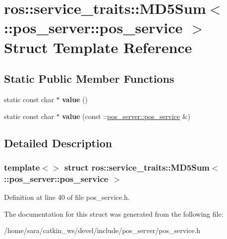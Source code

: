 \hypertarget{structros_1_1service__traits_1_1MD5Sum_3_01_1_1pos__server_1_1pos__service_01_4}{}\section{ros\+:\+:service\+\_\+traits\+:\+:M\+D5\+Sum$<$ \+:\+:pos\+\_\+server\+:\+:pos\+\_\+service $>$ Struct Template Reference}
\label{structros_1_1service__traits_1_1MD5Sum_3_01_1_1pos__server_1_1pos__service_01_4}
\subsection*{Static Public Member Functions}
\begin{DoxyCompactItemize}
\item 
\mbox{\label{structros_1_1service__traits_1_1MD5Sum_3_01_1_1pos__server_1_1pos__service_01_4_ab45735d9729ea45bd1fb07e1e0822a29}} 
static const char $\ast$ {\bfseries value} ()
\item 
\mbox{\label{structros_1_1service__traits_1_1MD5Sum_3_01_1_1pos__server_1_1pos__service_01_4_a321e272c5e52727cf869d2a4ccdd5f26}} 
static const char $\ast$ {\bfseries value} (const \+::\hyperlink{structpos__server_1_1pos__service}{pos\+\_\+server\+::pos\+\_\+service} \&)
\end{DoxyCompactItemize}


\subsection{Detailed Description}
\subsubsection*{template$<$$>$\newline
struct ros\+::service\+\_\+traits\+::\+M\+D5\+Sum$<$ \+::pos\+\_\+server\+::pos\+\_\+service $>$}



Definition at line 40 of file pos\+\_\+service.\+h.



The documentation for this struct was generated from the following file\+:\begin{DoxyCompactItemize}
\item 
/home/sara/catkin\+\_\+ws/devel/include/pos\+\_\+server/pos\+\_\+service.\+h\end{DoxyCompactItemize}
